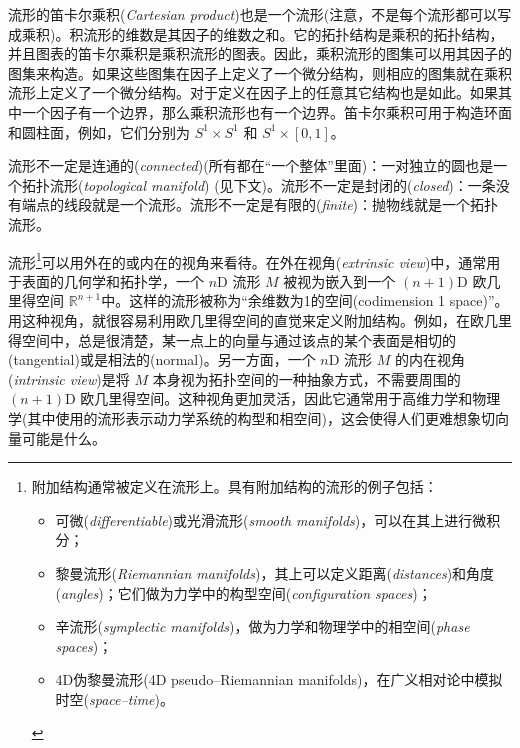\documentclass[11pt,fontset=founder]{ctexart}
\begin{document}
流形的笛卡尔乘积(\textit{Cartesian product})也是一个流形(注意，不是每个流形都可以写成乘积)。积流形的维数是其因子的维数之和。它的拓扑结构是乘积的拓扑结构，并且图表的笛卡尔乘积是乘积流形的图表。因此，乘积流形的图集可以用其因子的图集来构造。如果这些图集在因子上定义了一个微分结构，则相应的图集就在乘积流形上定义了一个微分结构。对于定义在因子上的任意其它结构也是如此。如果其中一个因子有一个边界，那么乘积流形也有一个边界。笛卡尔乘积可用于构造环面和圆柱面，例如，它们分别为 $S^1 \times S^1$ 和 $S^1 \times [0,1]$。

流形不一定是连通的(\emph{connected})(所有都在``一个整体''里面)：一对独立的圆也是一个拓扑流形(\textit{topological manifold}) (见下文)。流形不一定是封闭的(\emph{closed})：一条没有端点的线段就是一个流形。流形不一定是有限的(\emph{finite})：抛物线就是一个拓扑流形。

流形\footnote{%
{}
\par
附加结构通常被定义在流形上。具有附加结构的流形的例子包括：
\par
\begin{itemize}
\item 可微(\emph{differentiable})或光滑流形(\textit{smooth manifolds})，可以在其上进行微积分；
\par
\item 黎曼流形(\textit{Riemannian manifolds})，其上可以定义距离(\emph{distances})和角度(\emph{angles})；它们做为力学中的构型空间(\textit{configuration spaces})；
\par
\item 辛流形(\textit{symplectic manifolds})，做为力学和物理学中的相空间(\textit{phase spaces})；
\par
\item 4D伪黎曼流形(4D pseudo--Riemannian manifolds)，在广义相对论中模拟时空(\textit{space--time})。
\end{itemize}
}可以用外在的或内在的视角来看待。在外在视角(\textit{extrinsic view})中，通常用于表面的几何学和拓扑学，一个 $n$D 流形 $M$ 被视为嵌入到一个 $(n+1)$D 欧几里得空间 $\mathbb{R}^{n+1}$中。这样的流形被称为``余维数为1的空间(codimension 1 space)''。用这种视角，就很容易利用欧几里得空间的直觉来定义附加结构。例如，在欧几里得空间中，总是很清楚，某一点上的向量与通过该点的某个表面是相切的(tangential)或是相法的(normal)。另一方面，一个 $n$D 流形 $M$ 的内在视角(\textit{intrinsic view})是将 $M$ 本身视为拓扑空间的一种抽象方式，不需要周围的 $(n+1)$D 欧几里得空间。这种视角更加灵活，因此它通常用于高维力学和物理学(其中使用的流形表示动力学系统的构型和相空间)，这会使得人们更难想象切向量可能是什么。
\end{document}
